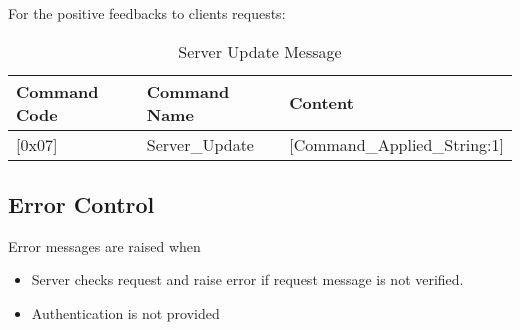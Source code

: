 For the positive feedbacks to clients requests:

\begin{table}[ht!]
  \centering
\begin{tabular}{l l l}
\hline
\textbf{Command Code} & \textbf{Command Name} & \textbf{Content}\\
\hline
\hline
\textsf{[0x07]} & \textsf{Server\_Update}  &     \textsf{[Command\_Applied\_String:1]} \\
\hline
\hline
\end{tabular}
\caption{Server Update Message}
\end{table}


\subsection{Error Control}
\label{sec:pdus:err}
Error messages are raised when
\begin{itemize}
\item Server checks request and raise error if request message is not verified.
\item Authentication is not provided
  \end{itemize}
